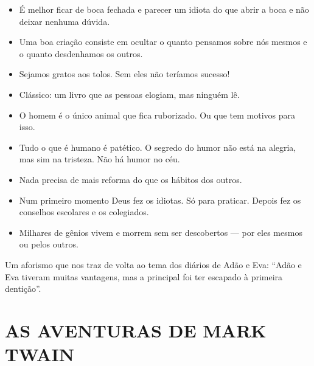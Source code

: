 \begin{itemize}
\item É melhor ficar de boca fechada e parecer um idiota do que abrir a
boca e não deixar nenhuma dúvida.

\item Uma boa criação consiste em ocultar o quanto pensamos sobre nós
mesmos e o quanto desdenhamos os outros.

\item Sejamos gratos aos tolos. Sem eles não teríamos sucesso!

\item Clássico: um livro que as pessoas elogiam, mas ninguém lê.

\item O homem é o único animal que fica ruborizado. Ou que tem motivos para
isso.

\item Tudo o que é humano é patético. O segredo do humor não está na
alegria, mas sim na tristeza. Não há humor no céu.

\item Nada precisa de mais reforma do que os hábitos dos outros.

\item Num primeiro momento Deus fez os idiotas. Só para praticar. Depois
fez os conselhos escolares e os colegiados.

\item Milhares de gênios vivem e morrem sem ser descobertos --- por eles
mesmos ou pelos outros.
\end{itemize}

Um aforismo que nos traz de volta ao tema dos diários de Adão e Eva:
``Adão e Eva tiveram muitas vantagens, mas a principal foi ter
escapado à primeira dentição''.



\section{AS AVENTURAS DE MARK TWAIN}

